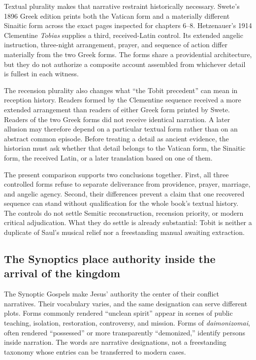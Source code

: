 Textual plurality makes that narrative restraint historically necessary.
Swete's 1896 Greek edition prints both the Vatican form and a materially
different Sinaitic form across the exact pages inspected for chapters 6--8.
Hetzenauer's 1914 Clementine \emph{Tobias} supplies a third, received-Latin
control. Its extended angelic instruction, three-night arrangement, prayer,
and sequence of action differ materially from the two Greek forms. The forms
share a providential architecture, but they do not authorize a composite
account assembled from whichever detail is fullest in each witness.

The recension plurality also changes what ``the Tobit precedent'' can mean in
reception history. Readers formed by the Clementine sequence received a more
extended arrangement than readers of either Greek form printed by Swete.
Readers of the two Greek forms did not receive identical narration. A later
allusion may therefore depend on a particular textual form rather than on an
abstract common episode. Before treating a detail as ancient evidence, the
historian must ask whether that detail belongs to the Vatican form, the
Sinaitic form, the received Latin, or a later translation based on one of
them.

The present comparison supports two conclusions together. First, all three
controlled forms refuse to separate deliverance from providence, prayer,
marriage, and angelic agency. Second, their differences prevent a claim that
one recovered sequence can stand without qualification for the whole book's
textual history. The controls do not settle Semitic reconstruction, recension
priority, or modern critical adjudication. What they do settle is already
substantial: Tobit is neither a duplicate of Saul's musical relief nor a
freestanding manual awaiting extraction.

\subsection{The Synoptics place authority inside the arrival of the kingdom}

The Synoptic Gospels make Jesus' authority the center of their conflict
narratives. Their vocabulary varies, and the same designation can serve
different plots. Forms commonly rendered ``unclean spirit'' appear in scenes
of public teaching, isolation, restoration, controversy, and mission. Forms
of \emph{daimonizomai}, often rendered ``possessed'' or more transparently
``demonized,'' identify persons inside narration. The words are narrative
designations, not a freestanding taxonomy whose entries can be transferred to
modern cases.

